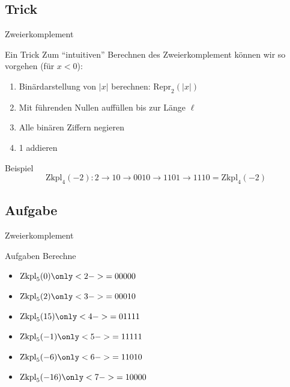 \subsection{Trick}
\begin{frame}{Zweierkomplement}
	\begin{exampleblock}{Ein Trick}
		Zum ``intuitiven'' Berechnen des Zweierkomplement können wir so vorgehen (für $x < 0$):
		\begin{enumerate}
			\item Binärdarstellung von $|x|$ berechnen: $\text{Repr}_2(|x|)$
			\item Mit führenden Nullen auffüllen bis zur Länge $\ell$
			\item Alle binären Ziffern negieren
			\item 1 addieren
		\end{enumerate}
	\end{exampleblock}

	\begin{exampleblock}{Beispiel}
		$$\text{Zkpl}_4(-2): 2 \rightarrow 10 \rightarrow 0010 \rightarrow 1101 \rightarrow 1110 = \text{Zkpl}_4(-2)$$
	\end{exampleblock}
\end{frame}
\subsection{Aufgabe}
\begin{frame}{Zweierkomplement}
	\begin{exampleblock}{Aufgaben}
	Berechne
		\begin{itemize}
			\item $\text{Zkpl}_5(0) \only<2->{= 00000}$ \\
			\item $\text{Zkpl}_5(2) \only<3->{= 00010}$ \\
			\item $\text{Zkpl}_5(15) \only<4->{= 01111}$ \\
			\item $\text{Zkpl}_5(-1) \only<5->{= 11111} $\\
			\item $\text{Zkpl}_5(-6) \only<6->{= 11010} $\\
			\item $\text{Zkpl}_5(-16) \only<7->{= 10000}$
		\end{itemize}
	\end{exampleblock}
\end{frame}

